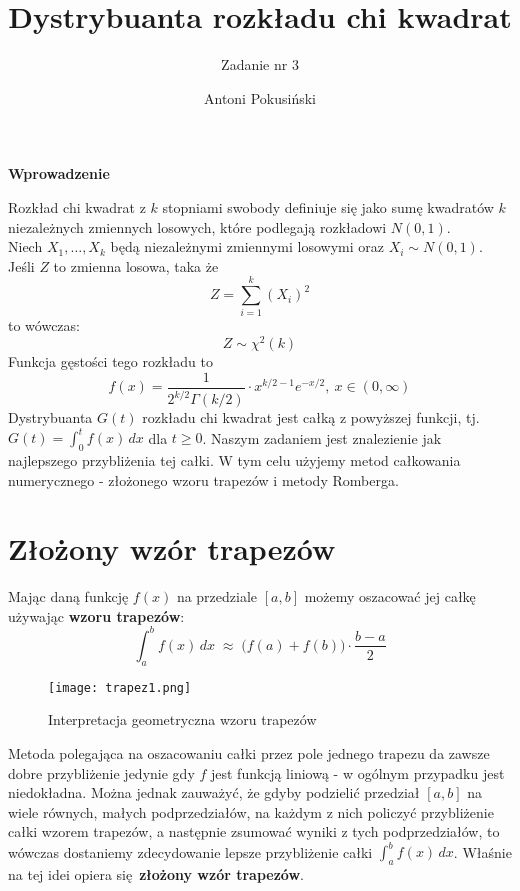 \documentclass[a4paper,10pt]{article}
\title{Dystrybuanta rozkładu chi kwadrat}
\author{Zadanie nr 3}
\date{Antoni Pokusiński}
\newcommand*\setcaptioncitation[1]{\def\captioncitation{\textit{Źródło:}~#1}}
\let\captioncitation\relax
\begin{document}
\maketitle
\begin{center}
	\textbf{\large Wprowadzenie}
\end{center}

Rozkład chi kwadrat z $k$ stopniami swobody definiuje się jako
sumę kwadratów $k$ niezależnych zmiennych losowych, które podlegają rozkładowi $N(0,1)$. \\ Niech $X_1, \ldots , X_k$ będą niezależnymi zmiennymi losowymi oraz $X_i \sim N(0,1)$. Jeśli $Z$ to zmienna losowa, taka że
\[ Z = \sum_{i=1}^k (X_i)^2 \]
to wówczas:
\[ Z \sim \chi^2(k) \]
Funkcja gęstości tego rozkładu to
\[ f(x) = \frac{1}{2^{k/2}\Gamma(k/2)}\cdot x^{k/2 - 1}e^{-x/2},\: x \in(0, \infty) \]
Dystrybuanta $G(t)$ rozkładu chi kwadrat jest całką z powyższej funkcji, tj. $G(t) = \int_0^tf(x)\, dx$ dla $t\geq 0$. Naszym zadaniem jest znalezienie jak najlepszego przybliżenia tej całki. W tym celu użyjemy metod całkowania numerycznego - złożonego wzoru trapezów i metody Romberga.

\newpage

\tableofcontents

\newpage

\section{Złożony wzór trapezów}
Mając daną funkcję $f(x)$ na przedziale $[a, b]$ możemy oszacować jej całkę używając \textbf{wzoru trapezów}:
\[ \int_a^bf(x)\, dx \; \approx \; \big(f(a) + f(b)\big) \cdot \frac{b-a}{2} \]

\begin{figure}[ht]
 \centering
 \texttt{[image: trapez1.png]}
 \setcaptioncitation{\texttt{https://en.wikipedia.org/wiki/Trapezoidal\_rule}}
 \caption{Interpretacja geometryczna wzoru trapezów}
\end{figure}

Metoda polegająca na oszacowaniu całki przez pole jednego trapezu da zawsze dobre przybliżenie jedynie gdy $f$ jest funkcją liniową - w ogólnym przypadku jest niedokładna. Można jednak zauważyć, że gdyby podzielić przedział $[a, b]$ na wiele równych, małych podprzedziałów, na każdym z nich policzyć przybliżenie całki wzorem trapezów, a następnie zsumować wyniki z tych podprzedziałów, to wówczas dostaniemy zdecydowanie lepsze przybliżenie całki $\int_a^bf(x)\, dx$. Właśnie na tej idei opiera się \textbf{złożony wzór trapezów}.
\end{document}
